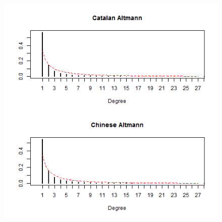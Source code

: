 \documentclass[paper=a4, fontsize=11pt]{scrartcl} %
\theoremstyle{plain}
\begin{document}
\begin{figure}[htbp] %
   \centering
   \includegraphics[width=15cm,height=27cm]{Altman_2} %
\end{figure}
\end{document}
